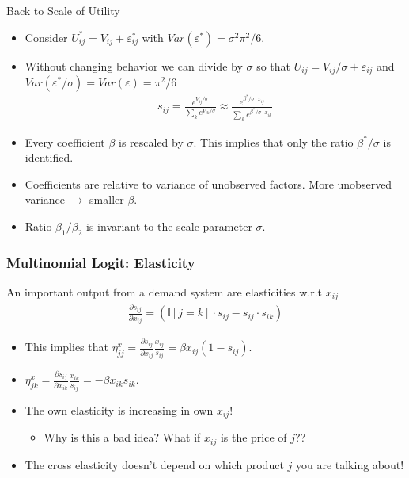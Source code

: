 \begin{frame}{Back to Scale of Utility}
\begin{itemize}
\item Consider $U_{ij}^{*} = V_{ij} + \varepsilon_{ij}^{*}$ with $Var(\varepsilon^{*}) = \sigma^2 \pi^2/6$.
\item Without changing behavior we can divide by $\sigma$ so that $U_{ij} = V_{ij}/\sigma + \varepsilon_{ij}$ and $Var(\varepsilon^{*}/\sigma)=Var(\varepsilon) = \pi^2/6$
\begin{align*}
s_{ij} = \frac{e^{V_{ij}/\sigma}}{\sum_k e^{V_{ik}/\sigma}} \approx \frac{e^{\beta^{*}/\sigma \cdot x_{ij}}}{\sum_k e^{\beta^{*}/\sigma \cdot x_{ik}}}
\end{align*}
\item Every coefficient $\beta$ is rescaled by $\sigma$. This implies that only the ratio $\beta^{*}/\sigma$ is identified. 
\item Coefficients are relative to variance of unobserved factors. More unobserved variance $\longrightarrow$ smaller $\beta$.
\item Ratio $\beta_1/\beta_2$ is invariant to the scale parameter $\sigma$.
\end{itemize}
\end{frame}


\begin{frame}
\frametitle{Multinomial Logit: Elasticity}
An important output from a demand system are elasticities w.r.t $x_{ij}$
\begin{align*}
\frac{\partial s_{ij}}{\partial x_{ij}} =\left(\mathbb{I}[j = k]\cdot s_{ij} - s_{ij}\cdot s_{ik} \right)
\end{align*}
\begin{itemize}
\item This implies that $ \eta_{jj}^x = \frac{\partial s_{ij}}{\partial x_{ij}} \frac{x_{ij}}{s_{ij}}  = \beta x_{ij} (1-s_{ij})$.
\item  $ \eta_{jk}^x = \frac{\partial s_{ij}}{\partial x_{ik}} \frac{x_{ik}}{s_{ij}}  = -\beta x_{ik} s_{ik}$.

\item The own elasticity is increasing in own $x_{ij}$!
\begin{itemize}
\item Why is this a bad idea? What if $x_{ij}$ is the price of $j$??
\end{itemize}
\item The cross elasticity doesn't depend on which product $j$ you are talking about!
\end{itemize}
\end{frame}


